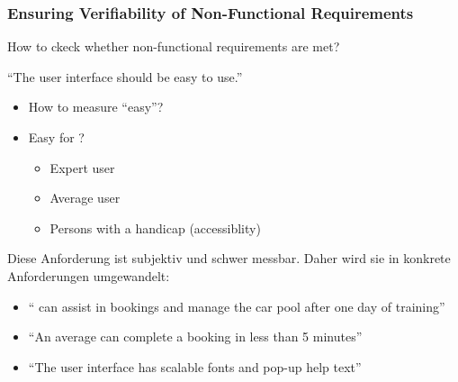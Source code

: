 \subsubsection{Ensuring Verifiability of Non-Functional Requirements}
How to ckeck whether non-functional requirements are met?
\begin{defBox}[title=Example (Typical usability requirement)]
    \enquote{The user interface should be easy to use.}
\end{defBox}
\begin{defBox}[title=Problems with this Requirement]
    \begin{itemize}
        \item How to measure \enquote{easy}?
        \item Easy for ?
        \begin{itemize}
            \item Expert user
            \item Average user
            \item Persons with a handicap (accessiblity)
        \end{itemize}
    \end{itemize}
\end{defBox}
\begin{infoBox}
     Diese Anforderung ist subjektiv und schwer messbar. Daher wird sie in konkrete Anforderungen umgewandelt:
\end{infoBox}
\begin{defBox}[title=Concretise Formulation into Quantifiable Requirements]
    \begin{itemize}
        \item \enquote{ can assist in bookings and manage the car pool after one day of training}
        \item \enquote{An average  can complete a booking in less than 5 minutes}
        \item \enquote{The user interface has scalable fonts and pop-up help text}
    \end{itemize}
\end{defBox}

